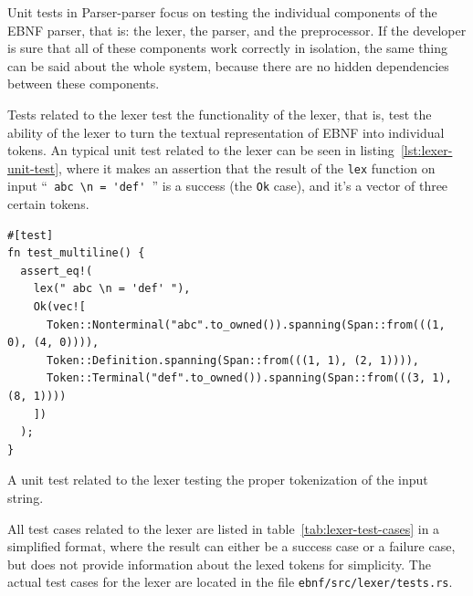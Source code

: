 \documentclass[english,engineering]{wizthesis}
\newcommand{\thisproject}{Parser-parser}
\begin{document}
Unit tests in \thisproject{} focus on testing the individual components of the
EBNF parser, that is: the lexer, the parser, and the preprocessor. If the
developer is sure that all of these components work correctly in isolation, the
same thing can be said about the whole system, because there are no hidden
dependencies between these components.

Tests related to the lexer test the functionality of the lexer, that is, test
the ability of the lexer to turn the textual representation of EBNF into
individual tokens. An typical unit test related to the lexer can be seen in
listing~\ref{lst:lexer-unit-test}, where it makes an assertion that the result
of the \texttt{lex} function on input ``\verb*| abc \n = 'def' |'' is a success
(the \texttt{Ok} case), and it's a vector of three certain tokens.

\begin{listing}[H]
  \begin{verbatim}
#[test]
fn test_multiline() {
  assert_eq!(
    lex(" abc \n = 'def' "),
    Ok(vec![
      Token::Nonterminal("abc".to_owned()).spanning(Span::from(((1, 0), (4, 0)))),
      Token::Definition.spanning(Span::from(((1, 1), (2, 1)))),
      Token::Terminal("def".to_owned()).spanning(Span::from(((3, 1), (8, 1))))
    ])
  );
}
  \end{verbatim}
  \caption{A unit test related to the lexer testing the proper tokenization of
  the input string.}
  \label{lst:lexer-unit-test}
\end{listing}

All test cases related to the lexer are listed in
table~\ref{tab:lexer-test-cases} in a simplified format, where the result can
either be a success case or a failure case, but does not provide information
about the lexed tokens for simplicity. The actual test cases for the lexer
are located in the file \texttt{ebnf/src/lexer/tests.rs}.
\end{document}
